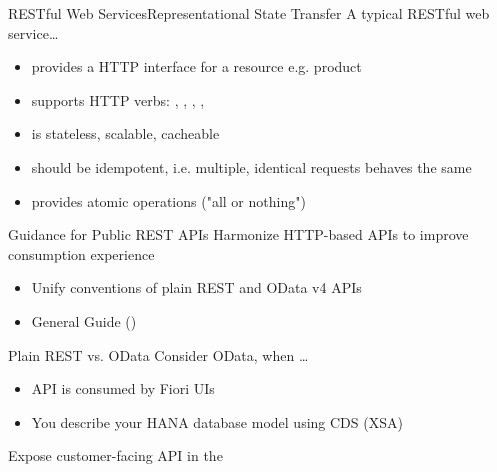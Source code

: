 \begin{frame}{RESTful Web Services}{Representational State Transfer}
A typical RESTful web service\ldots{}
\small
\begin{itemize}
\item provides a HTTP interface for a resource e.g. product
\item supports HTTP verbs: , , , , 
\item is stateless, scalable, cacheable
\item should be idempotent, i.e. multiple, identical requests behaves the same
\item provides atomic operations ("all or nothing") 
\end{itemize}
\vfill
\vspace{5mm}
\end{frame}


\begin{frame}{Guidance for Public REST APIs}
Harmonize HTTP-based APIs to improve consumption experience
\begin{itemize}
\item Unify conventions of plain REST and OData v4 APIs
\item General Guide  ()
\end{itemize}
\vfill
\begin{block}{Plain REST vs. OData}
\small
\vspace{+1mm}
Consider OData, when \ldots
\begin{itemize}
  \item API is consumed by Fiori UIs
  \item You describe your HANA database model using CDS (XSA)
\end{itemize}
\end{block}
\vfill
Expose customer-facing API in the 
\end{frame}

